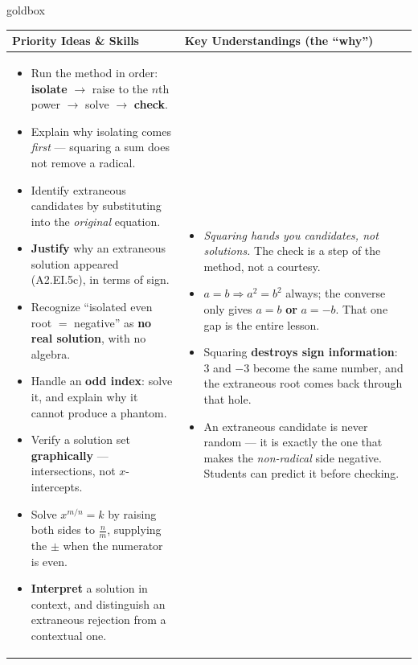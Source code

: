 \documentclass[10pt]{article}
\begin{document}
\renewcommand{\arraystretch}{1.4}
\begin{skillbox}{goldbox}
\begin{tabularx}{\linewidth}{@{}X|X@{}}
\textbf{Priority Ideas \& Skills} & \textbf{Key Understandings (the ``why'')} \\[2pt]
\hline
\vspace{-6pt}
\begin{itemize}[leftmargin=1.1em, nosep, after=\vspace{2pt}]
  \item Run the method in order: \textbf{isolate} $\rightarrow$ raise to the $n$th power $\rightarrow$ solve $\rightarrow$ \textbf{check}.
  \item Explain why isolating comes \emph{first} --- squaring a sum does not remove a radical.
  \item Identify extraneous candidates by substituting into the \emph{original} equation.
  \item \textbf{Justify} why an extraneous solution appeared (A2.EI.5c), in terms of sign.
  \item Recognize ``isolated even root $=$ negative'' as \textbf{no real solution}, with no algebra.
  \item Handle an \textbf{odd index}: solve it, and explain why it cannot produce a phantom.
  \item Verify a solution set \textbf{graphically} --- intersections, not $x$-intercepts.
  \item Solve $x^{m/n}=k$ by raising both sides to $\frac{n}{m}$, supplying the $\pm$ when the numerator is even.
  \item \textbf{Interpret} a solution in context, and distinguish an extraneous rejection from a contextual one.
\end{itemize}
&
\vspace{-6pt}
\begin{itemize}[leftmargin=1.1em, nosep, after=\vspace{2pt}]
  \item \emph{Squaring hands you candidates, not solutions.} The check is a step of the method, not a courtesy.
  \item $a=b \Rightarrow a^{2}=b^{2}$ always; the converse only gives $a=b$ \textbf{or} $a=-b$. That one gap is the entire lesson.
  \item Squaring \textbf{destroys sign information}: $3$ and $-3$ become the same number, and the extraneous root comes back through that hole.
  \item An extraneous candidate is never random --- it is exactly the one that makes the \emph{non-radical} side negative. Students can predict it before checking.

\end{itemize}
\end{tabularx}
\end{skillbox}
\end{document}

